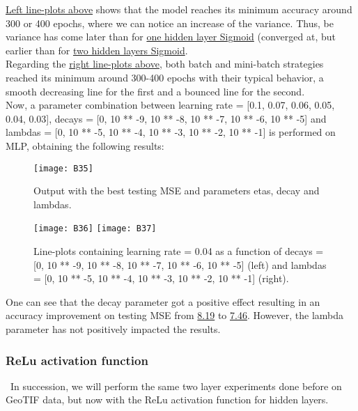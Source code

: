 \hyperref[fig:B22]{Left line-plots above} shows that the model reaches its minimum accuracy around 300 or 400 epochs, where we can notice an increase of the variance. Thus, be variance has come later than for \hyperref[fig:B5]{one hidden layer Sigmoid} (converged at, but earlier than for  \hyperref[fig:B14]{two hidden layers Sigmoid}.\\

Regarding the \hyperref[fig:B22]{right line-plots above}, both batch and mini-batch strategies reached its minimum around 300-400 epochs with their typical behavior, a smooth decreasing line for the first and a bounced line for the second.\\

Now, a parameter combination between learning rate = [0.1, 0.07, 0.06, 0.05, 0.04, 0.03], decays = [0, 10 ** -9, 10 ** -8, 10 ** -7, 10 ** -6, 10 ** -5] and lambdas = [0, 10 ** -5, 10 ** -4, 10 ** -3, 10 ** -2, 10 ** -1] is performed on MLP, obtaining the following results:

\begin{figure}[H]
\label{fig:B23}
\centering
\texttt{[image: B35]}
\caption{Output with the best testing MSE and parameters etas, decay and lambdas.}
\end{figure}

\begin{figure}[H]
\label{fig:B24}
\centering
\texttt{[image: B36]}
\texttt{[image: B37]}
\caption{Line-plots containing learning rate = 0.04 as a function of decays = [0, 10 ** -9, 10 ** -8, 10 ** -7, 10 ** -6, 10 ** -5] (left) and lambdas = [0, 10 ** -5, 10 ** -4, 10 ** -3, 10 ** -2, 10 ** -1] (right).}
\end{figure}

One can see that the decay parameter got a positive effect resulting in an accuracy improvement on testing MSE from \hyperref[fig:B18]{8.19} to \hyperref[fig:B23]{7.46}. However, the lambda parameter has not positively impacted the results.

\subsubsection{ReLu activation function}
\label{chap:ReLu activation function}

\qquad \, In succession, we will perform the same two layer experiments done before on GeoTIF data, but now with the ReLu activation function for hidden layers.\\

